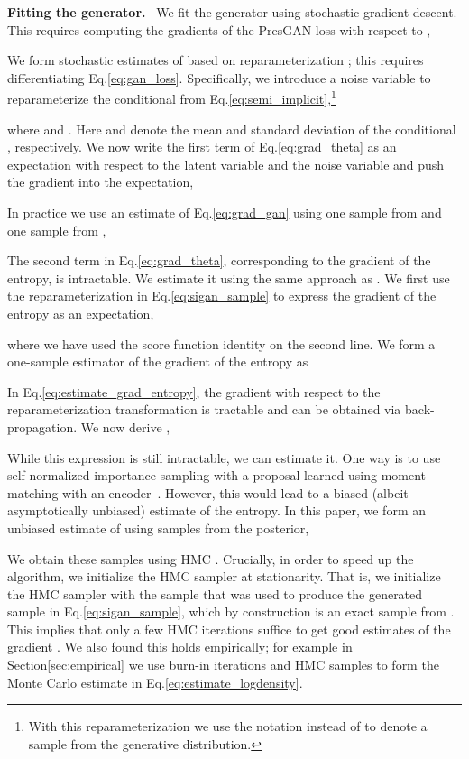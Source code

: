 \documentclass[11pt]{article}
\DeclareRobustCommand{\parhead}[1]{\textbf{#1}~}
\begin{document}
\parhead{Fitting the generator.}
We fit the generator using stochastic gradient descent. This requires computing the gradients of the Pres\gls{GAN} loss with respect to ,

We form stochastic estimates of  based on reparameterization \citep{kingma2013auto,rezende2014stochastic,titsias2014doubly}; this requires differentiating Eq.\nobreakspace \ref {eq:gan_loss}. Specifically, we introduce a noise variable  to reparameterize the conditional from Eq.\nobreakspace \ref {eq:semi_implicit},\footnote{With this reparameterization we use the notation  instead of  to denote a sample from the generative distribution.}

where  and . Here  and  denote the mean and standard deviation of the conditional , respectively. 
We now write the first term of Eq.\nobreakspace \ref {eq:grad_theta} as an expectation with respect to the latent variable  and the noise variable  and push the gradient into the expectation,

In practice we use an estimate of Eq.\nobreakspace \ref {eq:grad_gan} using one sample from  and one sample from ,

The second term in Eq.\nobreakspace \ref {eq:grad_theta}, corresponding to the gradient of the entropy, is intractable.  
We estimate it using the same approach as \citet{titsias2018unbiased}. 
We first use the reparameterization in Eq.\nobreakspace \ref {eq:sigan_sample} to express the gradient of the entropy as an expectation,

where we have used the score function identity  on the second line.
We form a one-sample estimator of the gradient of the entropy as

In Eq.\nobreakspace \ref {eq:estimate_grad_entropy}, the gradient with respect to the reparameterization transformation  is tractable and can be obtained via back-propagation.
We now derive ,

While this expression is still intractable, we can estimate it. One way is to use self-normalized importance sampling with a proposal learned using moment matching with an encoder~\citep{dieng2019reweighted}. However, this would lead to a biased (albeit asymptotically unbiased) estimate of the entropy. In this paper, we form an unbiased estimate of  using samples  from the posterior,

We obtain these samples using \gls{HMC} \citep{neal2011mcmc}.
Crucially, in order to speed up the algorithm, we initialize the \gls{HMC} sampler at stationarity. That is, we initialize the \gls{HMC} sampler with the sample  that was used to produce the generated sample  in Eq.\nobreakspace \ref {eq:sigan_sample}, which by construction is an exact sample from . 
This implies that only a few \gls{HMC} iterations suffice to get good estimates of the gradient \citep{titsias2018unbiased}. We also found this holds empirically; for example in Section\nobreakspace \ref {sec:empirical} we use  burn-in iterations and  \gls{HMC} samples to form the Monte Carlo estimate in Eq.\nobreakspace \ref {eq:estimate_logdensity}.
\end{document}
